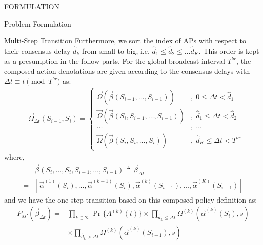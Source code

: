 \documentclass[10pt, conference, letterpaper]{IEEEtran}
\begin{document}
\begin{section}{FORMULATION}
\begin{subsection}{Problem Formulation}
\begin{subsubsection}{Multi-Step Transition}
                Furthermore, we sort the index of APs with respect to their consensus delay $\hat{d}_k$ from small to big, i.e. $\hat{d}_1 \leq \hat{d}_2 \leq \dots \hat{d}_{K}$. This order is kept as a presumption in the follow parts. For the global broadcast interval $T^{br}$, the composed action denotations are given according to the consensus delays with $\Delta{t} \equiv t \pmod{T^{br}}$ as:
                \begin{align}
                    &\vec{\Omega}_{\Delta{t}}(S_{i-1},S_{i}) = 
                    \begin{cases}
                        \vec{\Omega}(\vec{\beta}(S_{i-1}, \dots, S_{i-1})) &,\; 0 \leq \Delta{t} < \hat{d}_1 \\
                        \vec{\Omega}(\vec{\beta}(S_{i}, S_{i-1}, \dots, S_{i-1})) &,\; \hat{d}_1 \leq \Delta{t}< \hat{d}_2 \\
                        \dots &,\; \dots \\
                        \vec{\Omega}(\vec{\beta}(S_{i}, S_{i}, \dots, S_{i})) &,\; \hat{d}_{K} \leq \Delta{t} < T^{br}
                    \end{cases}
                \end{align}
                where,
                \begin{align}
                    & \vec{\beta}(S_i,\dots, S_i,S_{i-1}, \dots,S_{i-1}) \triangleq \vec{\beta}_{\Delta{t}}
                    \nonumber\\
                    = & [\vec{\alpha}^{(1)}(S_i),\dots,\vec{\alpha}^{(k-1)}(S_i),
                        \vec{\alpha}^{(k)}(S_{i-1}),\dots,\vec{\alpha}^{(K)}(S_{i-1})]
                \end{align}
                and we have the one-step transition based on this composed policy definition as:
                \begin{align}
                    P_{ss'}(\vec{\beta}_{\Delta{t}}) =& \prod_{k\in\mathcal{K}}{\Pr\{A^{(k)}(t)\}} \times \prod_{\hat{d}_k \leq \Delta{t}} { \Omega^{(k)}(\vec{\alpha}^{(k)}(S_{i}), s)}
                    \nonumber \\
                    & \times \prod_{\hat{d}_k > \Delta{t}} { \Omega^{(k)}(\vec{\alpha}^{(k)}(S_{i-1}), s) }
                \end{align}


\end{subsubsection}
\end{subsection}
\end{section}
\end{document}
